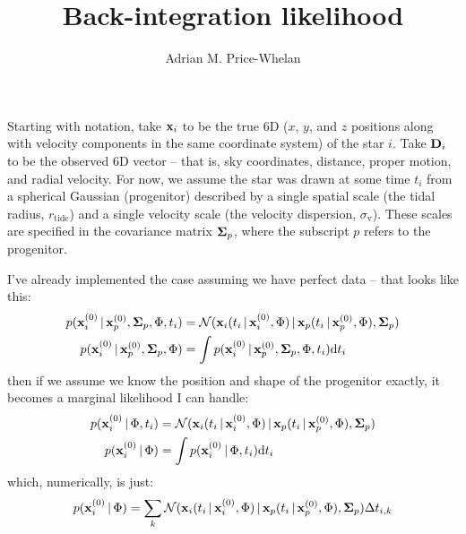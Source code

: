 \documentclass[letterpaper,12pt,preprint]{aastex}
\newcommand{\given}{\,|\,}
\newcommand{\dd}{\mathrm{d}}
\begin{document}
\title{Back-integration likelihood}
\author{Adrian M. Price-Whelan}

Starting with notation, take ${\bf x}_i$ to be the true 6D ($x$, $y$, and $z$ positions along with velocity components in the same coordinate system) of the star $i$. Take ${\bf D}_i$ to be the observed 6D vector -- that is, sky coordinates, distance, proper motion, and radial velocity. For now, we assume the star was drawn at some time $t_i$ from a spherical Gaussian (progenitor) described by a single spatial scale (the tidal radius, $r_{\mathrm{tide}}$) and a single velocity scale (the velocity dispersion, $\sigma_\mathrm{v}$). These scales are specified in the covariance matrix ${\bf \Sigma}_p$, where the subscript $p$ refers to the progenitor.

I've already implemented the case assuming we have perfect data -- that looks like this:
\begin{align}
	p({\bf x}_i^{(0)} \given {\bf x}_p^{(0)}, {\bf \Sigma}_p, \Phi, t_i) &= 
        \mathcal{N}({\bf x}_i(t_i\given {\bf x}_i^{(0)}, \Phi ) \given {\bf x}_p(t_i\given {\bf x}_p^{(0)}, \Phi ), {\bf \Sigma}_p)\\
	p({\bf x}_i^{(0)} \given {\bf x}_p^{(0)}, {\bf \Sigma}_p, \Phi) &= 
	\int p({\bf x}_i^{(0)} \given {\bf x}_p^{(0)}, {\bf \Sigma}_p, \Phi, t_i) \dd t_i\\
\end{align}
then if we assume we know the position and shape of the progenitor exactly, it becomes a marginal likelihood I can handle:
\begin{align}
	p({\bf x}_i^{(0)} \given \Phi, t_i) &= 
        \mathcal{N}({\bf x}_i(t_i\given {\bf x}_i^{(0)}, \Phi ) \given {\bf x}_p(t_i\given {\bf x}_p^{(0)}, \Phi ), {\bf \Sigma}_p)\\
	p({\bf x}_i^{(0)} \given \Phi) &= 
	\int p({\bf x}_i^{(0)} \given \Phi, t_i) \dd t_i\\
\end{align}
which, numerically, is just:
\begin{align}
	p({\bf x}_i^{(0)} \given \Phi) &= 
	\sum_k \mathcal{N}({\bf x}_i(t_i\given {\bf x}_i^{(0)}, \Phi ) \given {\bf x}_p(t_i\given {\bf x}_p^{(0)}, \Phi ), {\bf \Sigma}_p) \Delta t_{i,k}\\
\end{align}
\end{document}
